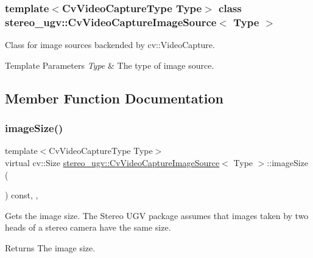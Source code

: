 \subsubsection*{template$<$Cv\+Video\+Capture\+Type Type$>$\newline
class stereo\+\_\+ugv\+::\+Cv\+Video\+Capture\+Image\+Source$<$ Type $>$}

Class for image sources backended by cv\+::\+Video\+Capture. 


\begin{DoxyTemplParams}{Template Parameters}
{\em Type} & The type of image source. \\
\hline
\end{DoxyTemplParams}


\subsection{Member Function Documentation}
\mbox{\label{classstereo__ugv_1_1CvVideoCaptureImageSource_a84dd7dbd0ff6091d68843ca02a18e0cc}} 
\subsubsection{\texorpdfstring{image\+Size()}{imageSize()}}
{\footnotesize\ttfamily template$<$Cv\+Video\+Capture\+Type Type$>$ \\
virtual cv\+::\+Size \hyperlink{classstereo__ugv_1_1CvVideoCaptureImageSource}{stereo\+\_\+ugv\+::\+Cv\+Video\+Capture\+Image\+Source}$<$ Type $>$\+::image\+Size (\begin{DoxyParamCaption}{ }\end{DoxyParamCaption}) const\hspace{0.3cm}{\ttfamily [inline]}, {\ttfamily [override]}, {\ttfamily [virtual]}}



Gets the image size. The Stereo U\+GV package assumes that images taken by two heads of a stereo camera have the same size. 

\begin{DoxyReturn}{Returns}
The image size. 
\end{DoxyReturn}


